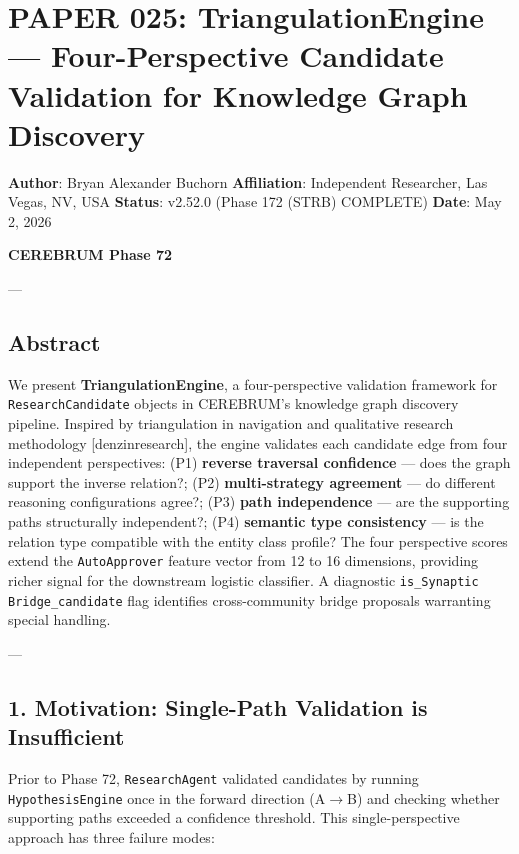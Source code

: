 \section{PAPER 025: Triang\-ulationEngine — Four-Perspective Candidate Validation for Knowledge Graph Discovery}

\textbf{Author}: Bryan Alexander Buchorn  
\textbf{Affiliation}: Independent Researcher, Las Vegas, NV, USA  
\textbf{Status}: v2.52.0 (Phase 172 (STRB) COMPLETE)
\textbf{Date}: May 2, 2026

\textbf{CEREBRUM Phase 72}

---

\subsection{Abstract}

We present \textbf{Triang\-ulationEngine}, a four-perspective validation framework for \texttt{ResearchCandidate} objects in CEREBRUM's knowledge graph discovery pipeline. Inspired by trian\-gulation in navigation and qualitative research methodology [denzin\-research], the engine validates each candidate edge from four independent persp\-ectives: (P1) \textbf{reverse traversal confidence} — does the graph support the inverse relation?; (P2) \textbf{multi-strategy agreement} — do different reasoning confi\-gurations agree?; (P3) \textbf{path indep\-endence} — are the supporting paths struc\-turally independent?; (P4) \textbf{semantic type consistency} — is the relation type compatible with the entity class profile? The four perspective scores extend the \texttt{AutoApprover} feature vector from 12 to 16 dimensions, providing richer signal for the downstream logistic classifier. A diagnostic \texttt{is\_Synaptic Bridge\_candidate} flag identifies cross-community bridge proposals warranting special handling.

---

\subsection{1. Motivation: Single-Path Validation is Insuff\-icient}

Prior to Phase 72, \texttt{ResearchAgent} validated candidates by running \texttt{HypothesisEngine} once in the forward direction (A$\to$B) and checking whether supporting paths exceeded a confidence threshold. This single-perspective approach has three failure modes:

